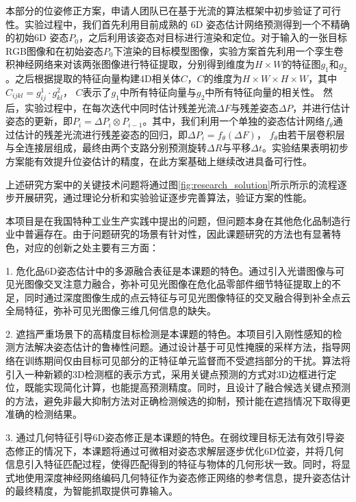 \documentclass[12pt]{article}
\begin{document}
本部分的位姿修正方案，申请人团队已在基于光流的算法框架中初步验证了可行性。实验过程中，我们首先利用目前成熟的 6D 姿态估计网络预测得到一个不精确的初始6D 姿态$P_0$，之后利用该姿态对目标进行渲染和定位。对于输入的一张目标RGB图像和在初始姿态$P_0$下渲染的目标模型图像，实验方案首先利用一个孪生卷积神经网络来对该两张图像进行特征提取，分别得到维度为$H\times W$的特征图$g_1$和$g_2$。之后根据提取的特征向量构建4D相关体$C$，$C$的维度为$H\times W \times H \times W$，其中    $C_{ijkl} = g^1_{ij} \cdot g^2_{kl}$，
$C$表示了$g_1$中所有特征向量与$g_2$中所有特征向量的相关性。
然后，实验过程中，在每次迭代中同时估计残差光流$\Delta F$与残差姿态$\Delta P$，并进行估计姿态的更新，即$P_i = \Delta P_i \otimes P_{i-1}$。其中，我们利用一个单独的姿态估计网络$f_{\theta}$通过估计的残差光流进行残差姿态的回归，即$\Delta P_i = f_{\theta}(\Delta F)$，
$f_\theta$由若干层卷积层与全连接层组成，最终由两个支路分别预测旋转$\Delta R$与平移$\Delta t$。实验结果表明初步方案能有效提升位姿估计的精度，在此方案基础上继续改进具备可行性。

上述研究方案中的关键技术问题将通过图\ref{fig:research_solution}所示所示的流程逐步开展研究，通过理论分析和实验验证逐步完善算法，验证方案的性能。



本项目是在我国特种工业生产实践中提出的问题，但问题本身在其他危化品制造行业中普遍存在。由于问题研究的场景有针对性，因此课题研究的方法也有显著特色，对应的创新之处主要有三方面：

1. 危化品6D姿态估计中的多源融合表征是本课题的特色。通过引入光谱图像与可见光图像交叉注意力融合，弥补可见光图像在危化品零部件细节特征提取上的不足，同时通过深度图像生成的点云特征与可见光图像特征的交叉融合得到补全点云全局特征，弥补可见光图像三维几何信息的缺失。

2. 遮挡严重场景下的高精度目标检测是本课题的特色。本项目引入刚性感知的检测方法解决姿态估计的鲁棒性问题。通过设计基于可见性掩膜的采样方法，指导网络在训练期间仅由目标可见部分的正特征单元监督而不受遮挡部分的干扰。算法将引入一种新颖的3D检测框的表示方式，采用关键点预测的方式对3D边框进行定位，既能实现简化计算，也能提高预测精度。同时，且设计了融合候选关键点预测的方法，避免非最大抑制方法对正确检测候选的抑制，预计能在遮挡情况下取得更准确的检测结果。

3. 通过几何特征引导6D姿态修正是本课题的特色。在弱纹理目标无法有效引导姿态修正的情况下，本课题将通过可微相对姿态求解层逐步优化6D位姿，并将几何信息引入特征匹配过程，使得匹配得到的特征与物体的几何形状一致。同时，将显式地使用深度神经网络编码几何特征作为姿态修正网络的参考信息，提升姿态估计的最终精度，为智能抓取提供可靠输入。
\end{document}
